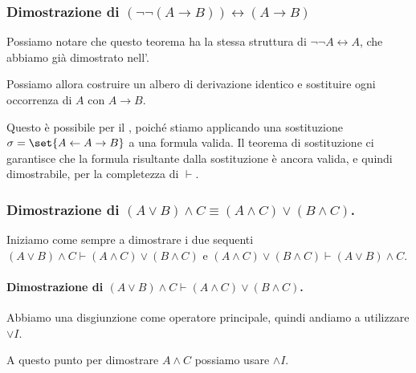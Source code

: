 \subsubsection*{Dimostrazione di \((\neg \neg (A \to B)) \leftrightarrow (A \to B)\)}

Possiamo notare che questo teorema ha la stessa struttura di \(\neg \neg A \leftrightarrow A\), che abbiamo già dimostrato nell'.

Possiamo allora costruire un albero di derivazione identico e sostituire ogni occorrenza di \(A\) con \(A \to B\).

Questo è possibile per il , poiché stiamo applicando una sostituzione \(\sigma = \set{A \leftarrow A \to B}\) a una formula valida. Il teorema di sostituzione ci garantisce che la formula risultante dalla sostituzione è ancora valida, e quindi dimostrabile, per la completezza di \(\vdash\).

\subsubsection*{Dimostrazione di \((A \lor B) \land C \equiv (A \land C) \lor (B \land C)\).}

Iniziamo come sempre a dimostrare i due sequenti \( (A \lor B) \land C \vdash (A \land C) \lor (B \land C)\) e \((A \land C) \lor (B \land C) \vdash (A \lor B) \land C\).

\paragraph{Dimostrazione di \((A \lor B) \land C \vdash (A \land C) \lor (B \land C)\).}

Abbiamo una disgiunzione come operatore principale, quindi andiamo a utilizzare \(\lor I\).

\begin{prooftree}
\end{prooftree}

A questo punto per dimostrare \(A \land C\) possiamo usare \(\land I\).

\begin{prooftree}
\end{prooftree}

